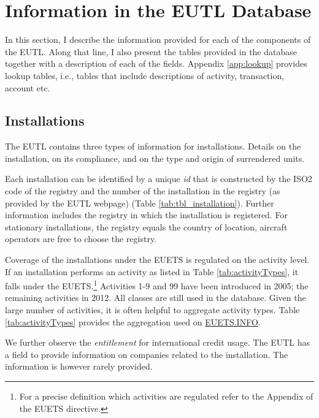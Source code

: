 \documentclass[authoryear]{elsarticle}
\begin{document}


\section{Information in the EUTL Database}
In this section, I describe the information provided for each of the components of the EUTL. Along that line, I also present the tables provided in the database together with a description of each of the fields. Appendix \ref{app:lookup} provides lookup tables, i.e., tables that include descriptions of activity, transaction, account etc.

\subsection{Installations}\label{sec:data_installation}

The EUTL contains three types of information for installations. Details on the installation, on its compliance, and on the type and origin of surrendered units.  

Each installation can be identified by a unique \textit{id} that is constructed by the ISO2 code of the registry and the number of the installation in the registry (as provided by the EUTL webpage) (Table \ref{tab:tbl_installation}). Further information includes the registry in which the installation is registered. For stationary installations, the registry equals the country of location, aircraft operators are free to choose the registry. 

Coverage of the installations under the EUETS is regulated on the activity level. If an installation performs an activity as listed in Table \ref{tab:activityTypes}, it falls under the EUETS.\footnote{For a precise definition which activities are regulated refer to the Appendix of the EUETS directive.} Activities 1-9 and 99 have been introduced in 2005; the remaining activities in 2012. All classes are still used in the database. Given the large number of activities, it is often helpful to aggregate activity types. Table \ref{tab:activityTypes} provides the aggregation used on \href{https://www.euets.info}{EUETS.INFO}.

We further observe the \textit{entitlement} for international credit usage. The EUTL has a field to provide information on companies related to the installation. The information is however rarely provided.
\end{document}
